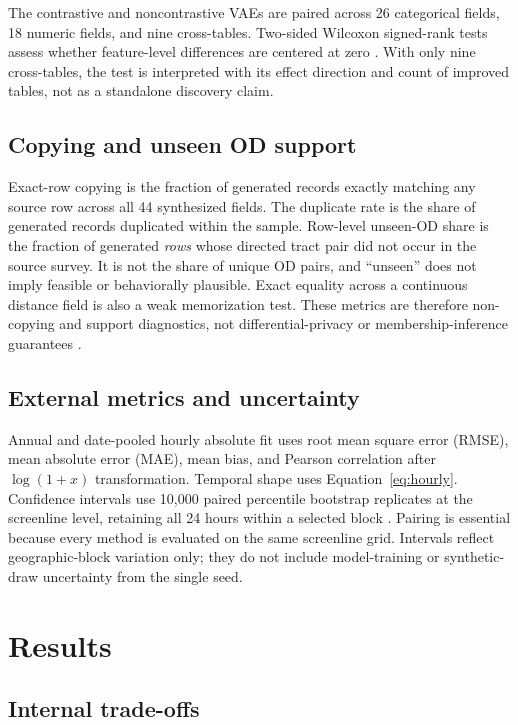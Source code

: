 \documentclass[numbered]{trbunofficial}
\begin{document}
The contrastive and noncontrastive VAEs are paired across 26 categorical fields, 18 numeric fields, and nine cross-tables. Two-sided Wilcoxon signed-rank tests assess whether feature-level differences are centered at zero \cite{wilcoxon1945rank}. With only nine cross-tables, the test is interpreted with its effect direction and count of improved tables, not as a standalone discovery claim.

\subsection{Copying and unseen OD support}

Exact-row copying is the fraction of generated records exactly matching any source row across all 44 synthesized fields. The duplicate rate is the share of generated records duplicated within the sample. Row-level unseen-OD share is the fraction of generated \emph{rows} whose directed tract pair did not occur in the source survey. It is not the share of unique OD pairs, and ``unseen'' does not imply feasible or behaviorally plausible. Exact equality across a continuous distance field is also a weak memorization test. These metrics are therefore non-copying and support diagnostics, not differential-privacy or membership-inference guarantees \cite{stadler2022groundhog}.

\subsection{External metrics and uncertainty}

Annual and date-pooled hourly absolute fit uses root mean square error (RMSE), mean absolute error (MAE), mean bias, and Pearson correlation after $\log(1+x)$ transformation. Temporal shape uses Equation~\ref{eq:hourly}. Confidence intervals use 10,000 paired percentile bootstrap replicates at the screenline level, retaining all 24 hours within a selected block \cite{efron1993bootstrap}. Pairing is essential because every method is evaluated on the same screenline grid. Intervals reflect geographic-block variation only; they do not include model-training or synthetic-draw uncertainty from the single seed.

\section{Results}

\subsection{Internal trade-offs}
\end{document}
